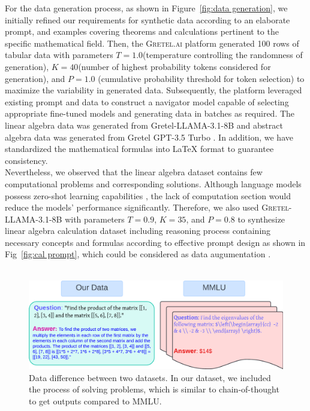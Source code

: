 \documentclass[10pt]{article}
\begin{document}
For the data generation process, as shown in Figure~\ref{fig:data generation}, we initially refined our requirements for synthetic data according to an elaborate prompt, and examples covering theorems and calculations pertinent to the specific mathematical field. Then, the \textsc{Gretel.ai} platform generated 100 rows of tabular data with parameters $T = 1.0$(temperature controlling the randomness of generation), $K = 40$(number of highest probability tokens considered for generation), and $P = 1.0$ (cumulative probability threshold for token selection) to maximize the variability in generated data. Subsequently, the platform leveraged existing prompt and data to construct a navigator model capable of selecting appropriate fine-tuned models and generating data in batches as required. The linear algebra data was generated from Gretel-LLAMA-3.1-8B \cite{MetaLLaMA31} and abstract algebra data was generated from Gretel GPT-3.5 Turbo \cite{OpenAIGPT35TurboFineTuning}. In addition, we have standardized the mathematical formulas into LaTeX format to guarantee consistency. \\

Nevertheless, we observed that the linear algebra dataset contains few computational problems and corresponding solutions. Although language models possess zero-shot learning capabilities \cite{Brown2020LanguageMA}, the lack of computation section would reduce the models' performance significantly. Therefore, we also used \textsc{Gretel-LLAMA-3.1-8B} with parameters $T = 0.9$, $K = 35$, and $P = 0.8$ to synthesize linear algebra calculation dataset including reasoning process containing necessary concepts and formulas according to effective prompt design as shown in Fig~\ref{fig:cal prompt}, which could be considered as data augumentation \cite{ding2024dataaugmentationusinglarge}. \\
\\
\begin{figure}[h]
    \centering
    \includegraphics[width=0.9\linewidth]{Figures/Data Comparision.png}
    \caption{Data difference between two datasets. In our dataset, we included the process of solving problems, which is similar to chain-of-thought \cite{wei2023chainofthoughtpromptingelicitsreasoning} to get outputs compared to MMLU.}
    \label{fig:data comparision}
\end{figure}
\end{document}
